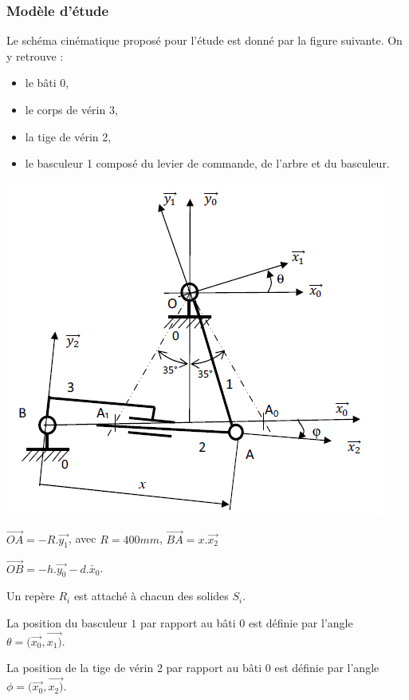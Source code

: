 \subsubsection{Modèle d'étude}
Le schéma cinématique proposé pour l'étude est donné par la figure suivante. On y retrouve :
\begin{itemize}
 \item le bâti 0,
 \item le corps de vérin 3,
 \item la tige de vérin 2,
 \item le basculeur 1 composé du levier de commande, de l'arbre et du basculeur.
\end{itemize}

\begin{minipage}{0.6\linewidth}
	\includegraphics[width=0.9\linewidth]{img/Annexe3}
\end{minipage}
\hfill
\begin{minipage}{0.35\linewidth}
$\overrightarrow{OA}=-R.\overrightarrow{y_1}$, avec $R=400mm$, $\overrightarrow{BA}=x.\overrightarrow{x_2}$

$\overrightarrow{OB}=-h.\overrightarrow{y_0}-d.\overleftarrow{x_0}$.
\end{minipage}

Un repère $R_i$ est attaché à chacun des solides $S_i$.

La position du basculeur $1$ par rapport au bâti $0$ est définie par l'angle $\theta=(\overrightarrow{x_0},\overrightarrow{x_1)}$.

La position de la tige de vérin 2 par rapport au bâti 0 est définie par l'angle $\phi=(\overrightarrow{x_0},\overrightarrow{x_2)}$.

